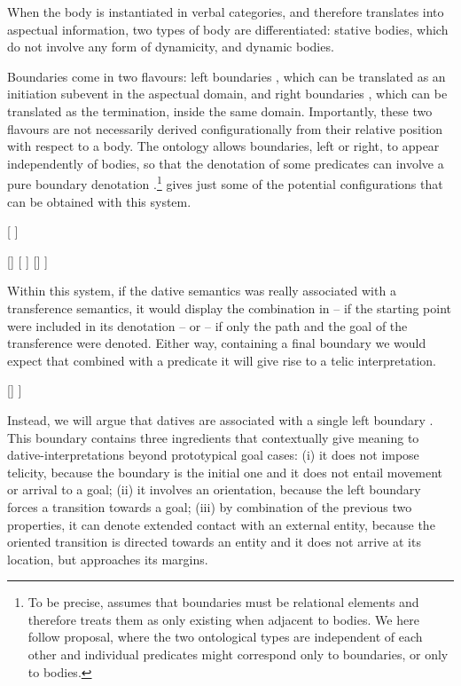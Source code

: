 \documentclass[output=paper,colorlinks,citecolor=brown,nonflat]{langsci/langscibook}
\begin{document}
When the body is instantiated in verbal categories, and therefore translates into aspectual information, two types of body are differentiated: stative bodies, which do not involve any form of dynamicity, and dynamic bodies. 

Boundaries come in two flavours: left boundaries , which can be translated as an initiation subevent in the aspectual domain, and right boundaries , which can be translated as the termination, inside the same domain. Importantly, these two flavours are not necessarily derived configurationally from their relative position with respect to a body. The ontology allows boundaries, left or right, to appear independently of bodies, so that the denotation of some predicates can involve a pure boundary denotation \citep{MarínMcNally2011}.\footnote{To be precise, \citet{Piñón1997} assumes that boundaries must be relational elements and therefore treats them as only existing when adjacent to bodies. We here follow  proposal, where the two ontological types are independent of each other and individual predicates might correspond only to boundaries, or only to bodies.}  gives just some of the potential configurations that can be obtained with this system.

\ea%
    \label{ex:fabregas:14}
    \ea\label{ex:fabregas:14a}{}
    [
    \ex\label{ex:fabregas:14b}{}
    ]
    \z
\z

\ea%
    \label{ex:fabregas:15}
    \ea\label{ex:fabregas:15a}{}
    [{\midline}]
    \ex\label{ex:fabregas:15b}{}
    [{\midline}
    \ex\label{ex:fabregas:15c}{}
    ]{\midline}
    \ex\label{ex:fabregas:15d}{}
    []
    \ex\label{ex:fabregas:15e}{}
    ]
    \z
\z

Within this system, if the dative semantics was really associated with a transference semantics, it would display the combination in  – if the starting point were included in its denotation – or  – if only the path and the goal of the transference were denoted. Either way, containing a final boundary we would expect that combined with a predicate it will give rise to a telic interpretation.

\ea%
    \label{ex:fabregas:16}
    \ea\label{ex:fabregas:16a}{}
    [{\midline}]
    \ex\label{ex:fabregas:16b}{}
    {\midline}]
    \z
\z

Instead, we will argue that datives are associated with a single left boundary . This boundary contains three ingredients that contextually give meaning to dative-interpretations beyond prototypical goal cases: (i) it does not impose telicity, because the boundary is the initial one and it does not entail movement or arrival to a goal; (ii) it involves an orientation, because the left boundary forces a transition towards a goal; (iii) by combination of the previous two properties, it can denote extended contact with an external entity, because the oriented transition is directed towards an entity and it does not arrive at its location, but approaches its margins.
 
\end{document}
